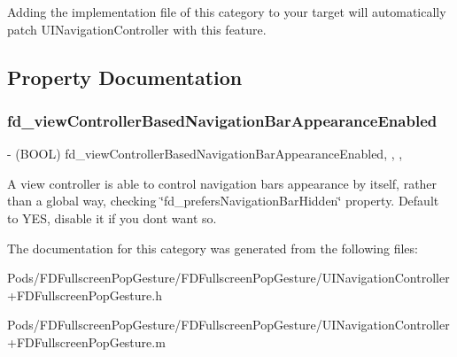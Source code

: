 Adding the implementation file of this category to your target will automatically patch U\+I\+Navigation\+Controller with this feature. 

\subsection{Property Documentation}
\mbox{\label{category_u_i_navigation_controller_07_f_d_fullscreen_pop_gesture_08_a42b42cdd60b7ddf8a22fd0fe5bfa36f5}} 
\subsubsection{\texorpdfstring{fd\+\_\+view\+Controller\+Based\+Navigation\+Bar\+Appearance\+Enabled}{fd\_viewControllerBasedNavigationBarAppearanceEnabled}}
{\footnotesize\ttfamily -\/ (B\+O\+OL) fd\+\_\+view\+Controller\+Based\+Navigation\+Bar\+Appearance\+Enabled\hspace{0.3cm}{\ttfamily [read]}, {\ttfamily [write]}, {\ttfamily [nonatomic]}, {\ttfamily [assign]}}

A view controller is able to control navigation bar\textquotesingle{}s appearance by itself, rather than a global way, checking \char`\"{}fd\+\_\+prefers\+Navigation\+Bar\+Hidden\char`\"{} property. Default to Y\+ES, disable it if you don\textquotesingle{}t want so. 

The documentation for this category was generated from the following files\+:\begin{DoxyCompactItemize}
\item 
Pods/\+F\+D\+Fullscreen\+Pop\+Gesture/\+F\+D\+Fullscreen\+Pop\+Gesture/U\+I\+Navigation\+Controller+\+F\+D\+Fullscreen\+Pop\+Gesture.\+h\item 
Pods/\+F\+D\+Fullscreen\+Pop\+Gesture/\+F\+D\+Fullscreen\+Pop\+Gesture/U\+I\+Navigation\+Controller+\+F\+D\+Fullscreen\+Pop\+Gesture.\+m\end{DoxyCompactItemize}
